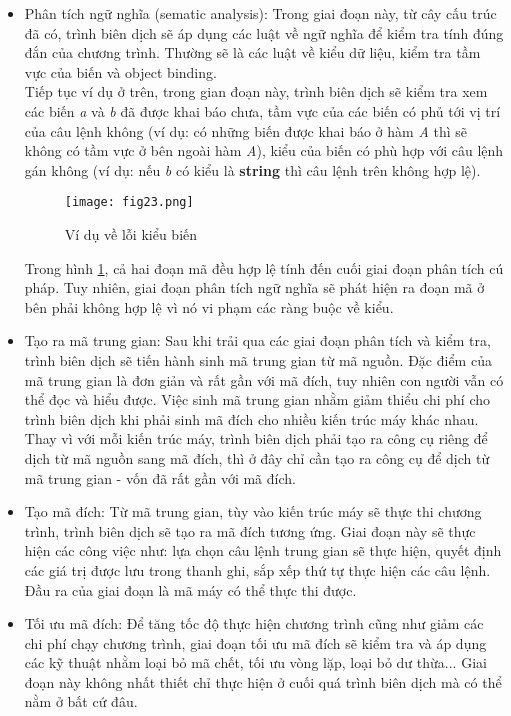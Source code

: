 \begin{itemize}
	\item Phân tích ngữ nghĩa (sematic analysis): Trong giai đoạn này, từ cây cấu trúc đã có, trình biên dịch sẽ áp dụng các luật về ngữ nghĩa để kiểm tra tính đúng đắn của chương trình. Thường sẽ là các luật về kiểu dữ liệu, kiểm tra tầm vực của biến và object binding.\\
	Tiếp tục ví dụ ở trên, trong gian đoạn này, trình biên dịch sẽ kiểm tra xem các biến \textit{a} và \textit{b} đã được khai báo chưa, tầm vực của các biến có phủ tới vị trí của câu lệnh không (ví dụ: có những biến được khai báo ở hàm \textit{A} thì sẽ không có tầm vực ở bên ngoài hàm \textit{A}), kiểu của biến có phù hợp với câu lệnh gán không (ví dụ: nếu \textit{b} có kiểu là \textbf{string} thì câu lệnh trên không hợp lệ).
	\begin{figure}[h]
		\centering
		\texttt{[image: fig23.png]}
		\caption{Ví dụ về lỗi kiểu biến}
		\label{fig:semerror}
	\end{figure}
	
	Trong hình \ref{fig:semerror}, cả hai đoạn mã đều hợp lệ tính đến cuối giai đoạn phân tích cú pháp. Tuy nhiên, giai đoạn phân tích ngữ nghĩa sẽ phát hiện ra đoạn mã ở bên phải không hợp lệ vì nó vi phạm các ràng buộc về kiểu.
	
	\item Tạo ra mã trung gian: Sau khi trải qua các giai đoạn phân tích và kiểm tra, trình biên dịch sẽ tiến hành sinh mã trung gian từ mã nguồn. Đặc điểm của mã trung gian là đơn giản và rất gần với mã đích, tuy nhiên con người vẫn có thể đọc và hiểu được. Việc sinh mã trung gian nhằm giảm thiểu chi phí cho trình biên dịch khi phải sinh mã đích cho nhiều kiến trúc máy khác nhau. Thay vì với mỗi kiến trúc máy, trình biên dịch phải tạo ra công cụ riêng để dịch từ mã nguồn sang mã đích, thì ở đây chỉ cần tạo ra công cụ để dịch từ mã trung gian - vốn đã rất gần với mã đích.\\
	
	
	\item Tạo mã đích: Từ mã trung gian, tùy vào kiến trúc máy sẽ thực thi chương trình, trình biên dịch sẽ tạo ra mã đích tương ứng. Giai đoạn này sẽ thực hiện các công việc như: lựa chọn câu lệnh trung gian sẽ thực hiện, quyết định các giá trị được lưu trong thanh ghi, sắp xếp thứ tự thực hiện các câu lệnh. Đầu ra của giai đoạn là mã máy có thể thực thi được.
	
	
	\item Tối ưu mã đích: Để tăng tốc độ thực hiện chương trình cũng như giảm các chi phí chạy chương trình, giai đoạn tối ưu mã đích sẽ kiểm tra và áp dụng các kỹ thuật nhằm loại bỏ mã chết, tối ưu vòng lặp, loại bỏ dư thừa... Giai đoạn này không nhất thiết chỉ thực hiện ở cuối quá trình biên dịch mà có thể nằm ở bất cứ đâu.
\end{itemize}

